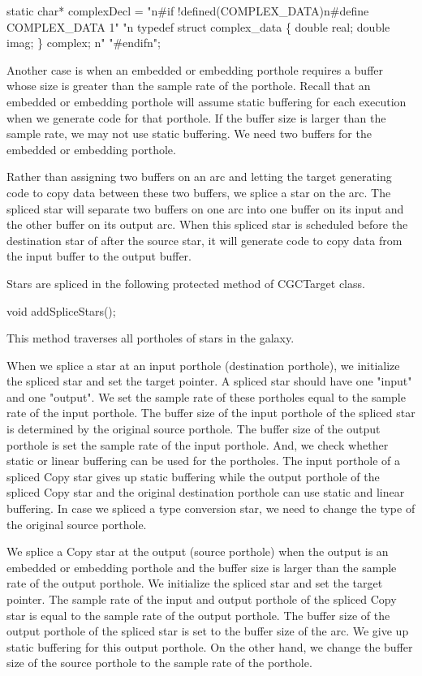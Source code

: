 {\begin{example}
static char* complexDecl =
"\back n#if !defined(COMPLEX_DATA)\back n#define COMPLEX_DATA 1"
"\back n typedef struct complex_data \{ double real; double imag; \} complex; \back n"
"#endif\back n";
\end{example}

Another case is when an embedded or embedding porthole requires a buffer
whose size is greater than the sample rate of the porthole. Recall that
an embedded or embedding porthole will assume static buffering for
each execution when we generate code for that porthole. If the buffer 
size is larger than the sample rate, we may not use static buffering. 
We need two buffers for the embedded or embedding porthole.

Rather than assigning two buffers on an arc and letting the target
generating code to copy data between these two buffers, we splice
a star on the arc. The spliced star will separate two buffers on one arc
into one buffer on its input and the other buffer on its output arc.
When this spliced star is scheduled before the destination star of after
the source star,
it will generate code to copy data from the input buffer to the output buffer.

Stars are spliced in the following protected method of CGCTarget class.

\begin{example}
void addSpliceStars();
\end{example}

This method traverses all portholes of stars in the galaxy.

When we splice a star at an input porthole (destination porthole), we
initialize the spliced star and set the target pointer. A spliced star should
have one "input" and one "output". We set the sample rate of these portholes
equal to the sample rate of the input porthole. The buffer size of the input
porthole of the spliced star is determined by the original source porthole.
The buffer size of the output porthole is set the sample rate of the
input porthole. And, we check whether static or linear buffering can be used
for the portholes. The input porthole of a spliced Copy star gives up
static buffering while the output porthole of the spliced Copy star and
the original destination porthole can use static and linear buffering.
In case we spliced a type conversion star, we need to change the type of the
original source porthole.

We splice a Copy star at the output (source porthole) when the output 
is an embedded or
embedding porthole and the buffer size is larger than the sample rate of
the output porthole. We initialize the spliced star and set the target
pointer. The sample rate of the input and output porthole of
the spliced Copy star is equal to the sample rate of the output porthole.
The buffer size of the output porthole of the spliced star is set to the
buffer size of the arc. We give up static buffering for this output
porthole. On the other hand, we change the buffer size of
the source porthole to the sample rate of the porthole. 

}
